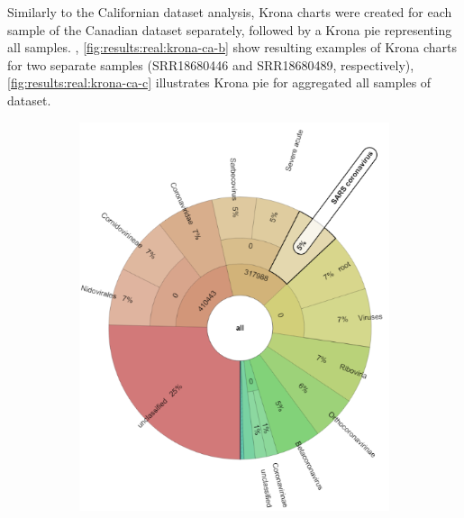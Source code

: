     Similarly to the Californian dataset analysis, Krona charts were created for each sample of the Canadian dataset separately, followed by a Krona pie representing all samples. , \ref{fig:results:real:krona-ca-b} show resulting examples of Krona charts for two separate samples (SRR18680446 and SRR18680489, respectively), \cref{fig:results:real:krona-ca-c} illustrates Krona pie for aggregated all samples of dataset.
    \begin{figure}[ht!]
        \centering
        \begin{subfigure}[b]{0.3\textwidth}
        \includegraphics[width=1\textwidth]{figures/results/real/krona/krona-ca-sSRR18680446.png}
        \label{fig:results:real:krona-ca-a}
        \end{subfigure}
        \hfill
        \begin{subfigure}[b]{0.3\textwidth}

\end{subfigure}
\end{figure}
